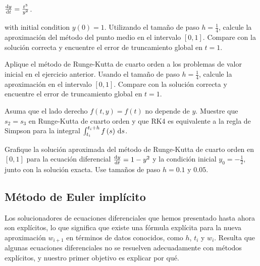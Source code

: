 \begin{questions}
\begin{multicols}{3}
\begin{parts}
            \begin{math}
                \diff{y}{t}=
                \frac{t^{3}}{y^{2}}
            \end{math}.
        \end{parts}
    \end{multicols}
    with initial condition $y\left(0\right)=1$.
    Utilizando el tamaño de paso $h=\frac{1}{4}$, calcule la
    aproximación del método del punto medio en el intervalo
    $\left[0,1\right]$.
    Compare con la solución correcta y encuentre el error de
    truncamiento global en $t=1$.

    \question

    Aplique el método de Runge-Kutta de cuarto orden a los problemas
    de valor inicial en el ejercicio anterior.
    Usando el tamaño de paso $h=\frac{1}{4}$, calcule la aproximación
    en el intervalo $\left[0,1\right]$.
    Compare con la solución correcta y encuentre el error de
    truncamiento global en $t=1$.

    \question

    Asuma que el lado derecho $f\left(t,y\right)=f\left(t\right)$ no depende de $y$.
    Muestre que $s_{2}=s_{3}$ en Runge-Kutta de cuarto orden y que
    RK4 es equivalente a la regla de Simpson para la integral
    \begin{math}
        \int_{t_{i}}^{t_{i}+h}
        f\left(s\right)
        \dl s
    \end{math}.

    \question

    Grafique la solución aproximada del método de Runge-Kutta de
    cuarto orden en $\left[0,1\right]$ para la ecuación diferencial
    $\diff{y}{t}=1-y^{2}$ y la condición inicial
    $y_{0}=-\frac{1}{2}$, junto con la solución exacta.
    Use tamaños de paso $h=0.1$ y $0.05$.
\end{questions}

\subsection{Método de Euler implícito}

Los solucionadores de ecuaciones diferenciales que hemos presentado
hasta ahora son explícitos, lo que significa que existe una fórmula
explícita para la nueva aproximación $w_{i+1}$ en términos de datos
conocidos, como $h$, $t_{i}$ y $w_{i}$.
Resulta que algunas ecuaciones diferenciales no se resuelven
adecuadamente con métodos explícitos, y nuestro primer objetivo es
explicar por qué.

